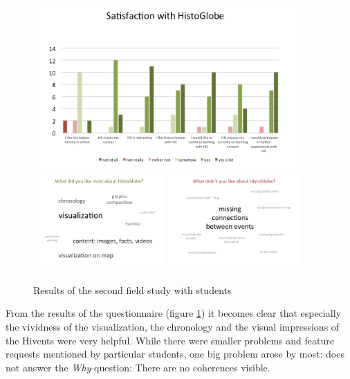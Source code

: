 \begin{figure}[H]
  \begin{center}
    \includegraphics[width=0.9\textwidth]{graphics/test-2-satisfaction.jpg} \\[0.5em]
    \includegraphics[width=0.45\textwidth]{graphics/test-2-tagcloud-pos.jpg}
    \includegraphics[width=0.45\textwidth]{graphics/test-2-tagcloud-neg.jpg}
  \end{center}
  \caption{Results of the second field study with students}
  \label{fig:studyresults-2}
\end{figure}

From the results of the questionnaire (figure \ref{fig:studyresults-2}) it becomes clear that especially the vividness of the visualization, the chronology and the visual impressions of the Hivents were very helpful. While there were smaller problems and feature requests mentioned by particular students, one big problem arose by most: \HG does not answer the \textit{Why}-question: There are no coherences visible.

